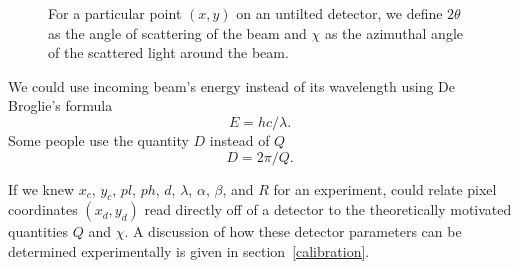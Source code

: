 \begin{SCfigure}[1][bthp]
    \centering
    
    \caption{For a particular point $(x,y)$ on an 
    untilted detector, we define $2\theta$ as the angle of 
    scattering of the beam and $\chi$ as the
    azimuthal angle of the scattered light around 
    the beam.}
    \label{TwoTheta}
\end{SCfigure}

We could use incoming beam's energy instead of its wavelength 
using De Broglie's formula
\begin{equation}
    E = hc/\lambda.
\end{equation}
Some people use the quantity $D$ instead of $Q$
\begin{equation}\label{DtermsQ}
    D = 2\pi/Q.
\end{equation}

If we knew $x_c$, $y_c$, $pl$, $ph$, $d$, $\lambda$,
$\alpha$, $\beta$, and $R$ for an experiment, could
relate pixel coordinates $(x_d,y_d)$ read directly off
of a detector to the
theoretically motivated quantities $Q$ and $\chi$.
A discussion of how these detector parameters can be 
determined experimentally
is given in section~\ref{calibration}.

%
%
